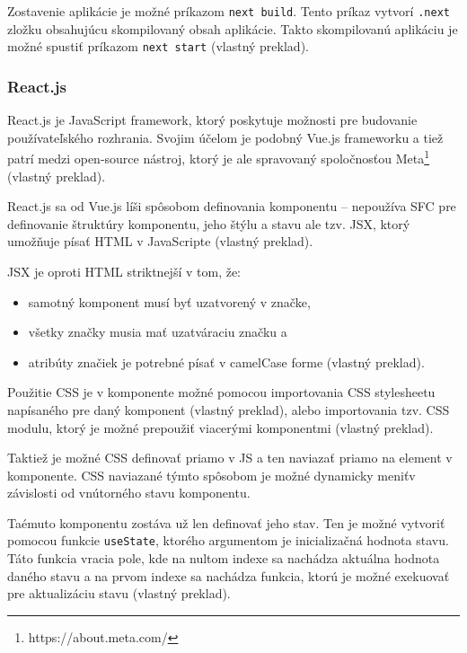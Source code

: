 Zostavenie aplikácie je možné príkazom \texttt{next build}. Tento príkaz vytvorí \texttt{.next} zložku obsahujúcu skompilovaný obsah aplikácie. Takto skompilovanú aplikáciu je možné spustiť príkazom \texttt{next start} \cite{nextjs_introduction} (vlastný preklad). 

\subsubsection {React.js}
React.js je JavaScript framework, ktorý poskytuje možnosti pre budovanie používateľského rozhrania. Svojim účelom je podobný Vue.js frameworku a tiež patrí medzi open-source nástroj, ktorý je ale spravovaný spoločnosťou Meta\footnote{https://about.meta.com/} \cite{about_react} (vlastný preklad).

React.js sa od Vue.js líši spôsobom definovania komponentu -- nepoužíva SFC pre definovanie štruktúry komponentu, jeho štýlu a stavu ale tzv. JSX, ktorý umožňuje písať HTML v JavaScripte \cite{about_react} (vlastný preklad).

JSX je oproti HTML striktnejší v tom, že:
\begin{itemize}
\item {samotný komponent musí byť uzatvorený v značke,}
\item {všetky značky musia mať uzatváraciu značku a}
\item {atribúty značiek je potrebné písať v camelCase forme \cite{jsx_rules} (vlastný preklad).}
\end{itemize}

Použitie CSS je v komponente možné pomocou importovania CSS stylesheetu napísaného pre daný komponent \cite{reactjs_stylesheet} (vlastný preklad), alebo importovania tzv. CSS modulu, ktorý je možné prepoužiť viacerými komponentmi \cite{reactjs_stylesheet_module} (vlastný preklad).

Taktiež je možné CSS definovať priamo v JS a ten naviazať priamo na element v komponente. CSS naviazané týmto spôsobom je možné dynamicky meniť\newline v závislosti od vnútorného stavu komponentu.

Taémuto komponentu zostáva už len definovať jeho stav. Ten je možné vytvoriť pomocou funkcie \texttt{useState}, ktorého argumentom je inicializačná hodnota stavu. Táto funkcia vracia pole, kde na nultom indexe sa nachádza aktuálna hodnota daného stavu a na prvom indexe sa nachádza funkcia, ktorú je možné exekuovať pre aktualizáciu stavu \cite{react_state} (vlastný preklad).

